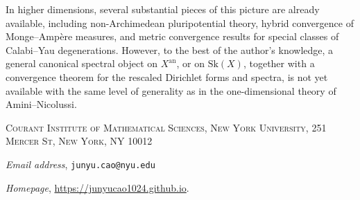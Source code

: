 \documentclass[12pt]{amsart}
\begin{document}
In higher dimensions, several substantial pieces of this picture are
already available, including non-Archimedean pluripotential theory,
hybrid convergence of Monge--Amp\`ere measures, and metric convergence
results for special classes of Calabi--Yau degenerations. However, to
the best of the author's knowledge, a general canonical spectral object
on \(X^{\mathrm{an}}\), or on \(\mathrm{Sk}(X)\), together with a
convergence theorem for the rescaled Dirichlet forms and spectra, is not
yet available with the same level of generality as in the
one-dimensional theory of Amini--Nicolussi.

\appendix




\bigskip
\footnotesize

\textsc{Courant Institute of Mathematical Sciences, 
New York University, 251
Mercer St, New York, NY 10012
}
\par\nopagebreak
\textit{Email address}, \texttt{junyu.cao@nyu.edu
}\par\nopagebreak
\textit{Homepage}, \url{https://junyucao1024.github.io}.
\end{document}
